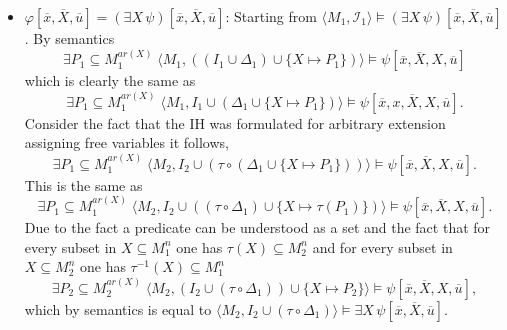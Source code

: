 \documentclass[11pt,a4paper]{article}
\begin{document}
\begin{itemize}[leftmargin=*]
\item  $\varphi[\overline{x}, \overline{X}, \overline{u}] = (\exists X \, \psi)[\overline{x}, \overline{X}, \overline{u}]$: Starting from $\langle M_1, \mathcal{I}_1 \rangle \models (\exists X \, \psi)[\overline{x}, \overline{X}, \overline{u}]$. By semantics  
\begin{equation*}
\exists P_1 \subseteq M_1^{ar(X)} \; \langle M_1 , ((I_1 \cup \Delta_1) \cup \{X \mapsto P_1\}) \rangle \models \psi[\overline{x}, \overline{X}, X, \overline{u}]
\end{equation*}
which is clearly the same as
\begin{equation*}
\exists P_1 \subseteq M_1^{ar(X)} \; \langle M_1 , I_1 \cup (\Delta_1 \cup \{X \mapsto P_1\}) \rangle \models \psi[\overline{x},x, \overline{X}, X, \overline{u}].
\end{equation*}
Consider the fact that the IH was formulated for arbitrary extension assigning free variables it follows,
 \begin{equation*}
\exists  P_1 \subseteq M_1^{ar(X)} \;  \langle M_2 , I_2 \cup (\tau \circ (\Delta_1 \cup \{X \mapsto P_1\})) \rangle \models \psi[\overline{x}, \overline{X},X, \overline{u}].
\end{equation*} 
This is the same as 
\begin{equation*}
\exists  P_1 \subseteq M_1^{ar(X)} \;  \langle M_2 , I_2 \cup ((\tau \circ \Delta_1) \cup \{X \mapsto \tau (P_1)\}) \rangle \models \psi[\overline{x}, \overline{X}, X, \overline{u}].
\end{equation*}
Due to the fact a predicate can be understood as a set and the fact that for every subset in $X \subseteq M_1^n$ one has $\tau(X) \subseteq M_2^n$ and for every subset in $X \subseteq M_2^n$ one has $\tau^{-1}(X) \subseteq M_1^n$ 
\begin{equation*}
\exists  P_2 \subseteq M_2^{ar(X)}\;  \langle M_2 , (I_2 \cup (\tau \circ \Delta_1)) \cup \{X \mapsto P_2 \} \rangle \models \psi[\overline{x}, \overline{X},X, \overline{u}],
\end{equation*}
which by semantics is equal to $\langle M_2 , I_2 \cup (\tau \circ \Delta_1)\rangle \models \exists X \, \psi[\overline{x}, \overline{X}, \overline{u}]$. \\





\end{itemize}
\end{document}
